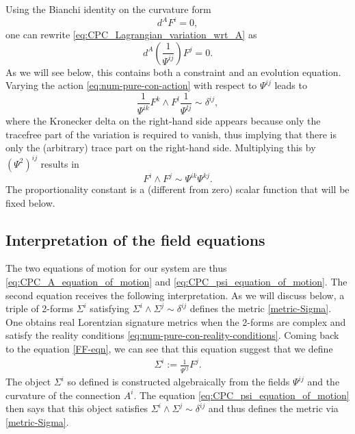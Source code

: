 \documentclass[10pt]{report}
\theoremstyle{definition}
\begin{document}
Using the Bianchi identity on the curvature form
\begin{equation}
    d^A F^i = 0,
\end{equation}
one can rewrite \cref{eq:CPC_Lagrangian_variation_wrt_A} as
\begin{equation}
    d^A \left( \frac{1}{\Psi^{ij}} \right) F^j = 0.
    \label{eq:CPC_A_equation_of_motion}
\end{equation}
As we will see below, this contains both a constraint and an evolution equation. Varying the action \cref{eq:num-pure-con-action} with respect to $\Psi^{ij}$ leads to
\begin{equation}\label{FF-eqn}
    \frac{1}{\Psi^{ik}} F^k \wedge F^l \frac{1}{\Psi^{lj}} \sim \delta^{ij},
\end{equation}
where the Kronecker delta on the right-hand side appears because only the tracefree part of the variation is required to vanish, thus implying that there is only the (arbitrary) trace part on the right-hand side.
Multiplying this by $(\Psi^2)^{ij}$ results in
\begin{equation}
    F^i \wedge F^j \sim \Psi^{ik} \Psi^{kj}.
    \label{eq:CPC_psi_equation_of_motion}
\end{equation}
The proportionality constant is a (different from zero) scalar function that will be fixed below. 

\subsection{Interpretation of the field equations}

The two equations of motion for our system are thus \cref{eq:CPC_A_equation_of_motion} and 
 \cref{eq:CPC_psi_equation_of_motion}. The second equation receives the following interpretation. As we will discuss below, a triple of 2-forms $\Sigma^i$ satisfying $\Sigma^i \wedge \Sigma^j\sim \delta^{ij}$ defines the metric \cref{metric-Sigma}. One obtains real Lorentzian signature metrics when the 2-forms are complex and satisfy the reality conditions \cref{eq:num-pure-con-reality-conditions}. Coming back to the equation \cref{FF-eqn}, we can see that this equation suggest that we define
 \begin{align}\label{Sigma-def}
 \Sigma^i := \frac{1}{\Psi^{ij}} F^j.
 \end{align}
 The object $\Sigma^i$ so defined is constructed algebraically from the fields $\Psi^{ij}$ and the curvature of the connection $A^i$. The equation \cref{eq:CPC_psi_equation_of_motion} then says that this object satisfies $\Sigma^i \wedge \Sigma^j\sim \delta^{ij}$ and thus defines the metric via \cref{metric-Sigma}.
 
\end{document}
